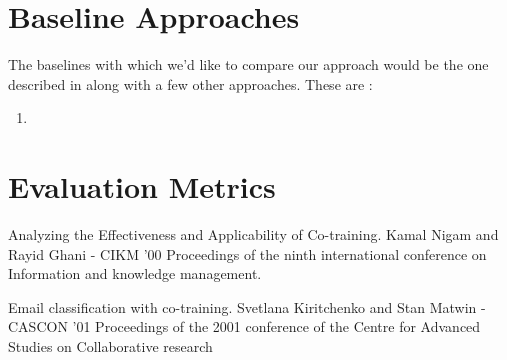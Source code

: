 \section{Baseline Approaches}
The baselines with which we'd like to compare our approach would be the one described in \cite{duck} along with a few other approaches.  These are :

\begin{enumerate}
\item 
\end{enumerate}

\section{Evaluation Metrics}

\begin{thebibliography}{2}
 Analyzing the Effectiveness and Applicability
of Co-training. Kamal Nigam and Rayid Ghani - CIKM '00 Proceedings of the ninth international conference on Information and knowledge management. 

 Email classification with co-training. Svetlana Kiritchenko and Stan Matwin - 
CASCON '01 Proceedings of the 2001 conference of the Centre for Advanced Studies on Collaborative research
\end{thebibliography}


